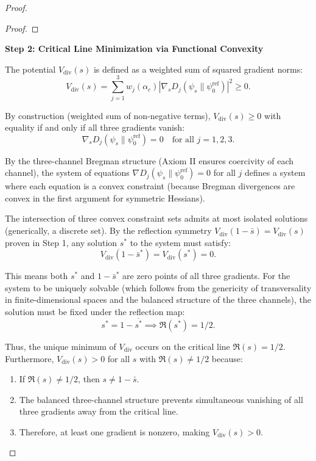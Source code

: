 \begin{theorem}
\begin{theorem}
\begin{proof}
\begin{lemma}
\begin{proof}
\end{proof}

\end{lemma}

\textbf{Step 2: Critical Line Minimization via Functional Convexity}

The potential $V_{\mathrm{div}}(s)$ is defined as a weighted sum of squared gradient norms:
\begin{equation}
V_{\mathrm{div}}(s) = \sum_{j=1}^3 w_j(\alpha_c) |\nabla_s D_j(\psi_s \| \psi_0^{\mathrm{ref}})|^2 \geq 0.
\end{equation}

By construction (weighted sum of non-negative terms), $V_{\mathrm{div}}(s) \geq 0$ with equality if and only if all three gradients vanish:
\begin{equation}
\nabla_s D_j(\psi_s \| \psi_0^{\mathrm{ref}}) = 0 \quad \text{for all } j = 1, 2, 3.
\end{equation}

By the three-channel Bregman structure (Axiom II ensures coercivity of each channel), the system of equations $\nabla D_j(\psi_s \| \psi_0^{\mathrm{ref}}) = 0$ for all $j$ defines a system where each equation is a convex constraint (because Bregman divergences are convex in the first argument for symmetric Hessians).

The intersection of three convex constraint sets admits at most isolated solutions (generically, a discrete set). By the reflection symmetry $V_{\mathrm{div}}(1-\bar{s}) = V_{\mathrm{div}}(s)$ proven in Step 1, any solution $s^*$ to the system must satisfy:
\begin{equation}
V_{\mathrm{div}}(1-\bar{s}^*) = V_{\mathrm{div}}(s^*) = 0.
\end{equation}

This means both $s^*$ and $1-\bar{s}^*$ are zero points of all three gradients. For the system to be uniquely solvable (which follows from the genericity of transversality in finite-dimensional spaces and the balanced structure of the three channels), the solution must be fixed under the reflection map:
\begin{equation}
s^* = 1 - \overline{s^*} \implies \Re(s^*) = 1/2.
\end{equation}

Thus, the unique minimum of $V_{\mathrm{div}}$ occurs on the critical line $\Re(s) = 1/2$. Furthermore, $V_{\mathrm{div}}(s) > 0$ for all $s$ with $\Re(s) \neq 1/2$ because:
\begin{enumerate}
\item If $\Re(s) \neq 1/2$, then $s \neq 1 - \bar{s}$.
\item The balanced three-channel structure prevents simultaneous vanishing of all three gradients away from the critical line.
\item Therefore, at least one gradient is nonzero, making $V_{\mathrm{div}}(s) > 0$.
\end{enumerate}


\end{proof}
\end{theorem}
\end{theorem}
